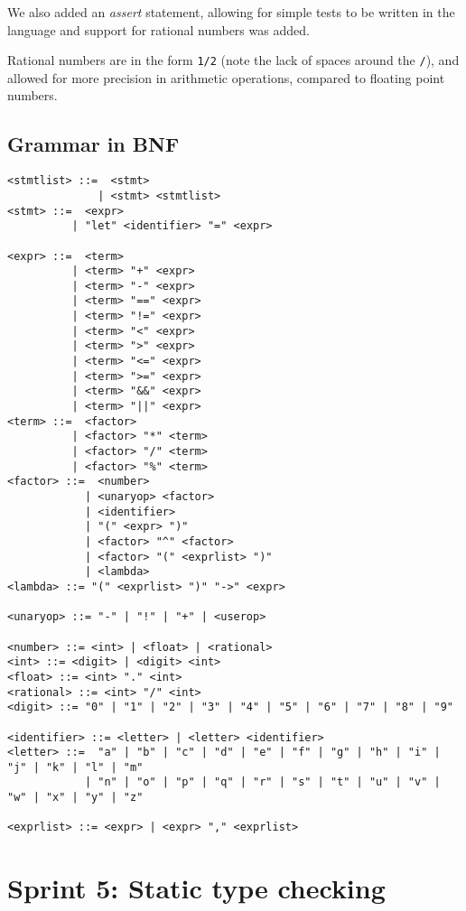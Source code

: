 We also added an \textit{assert} statement, allowing for simple tests to be written in the language and support for 
rational numbers was added.

Rational numbers are in the form \texttt{1/2} (note the lack of spaces around the \texttt{/}), and allowed for more 
precision in arithmetic operations, compared to floating point numbers.

\subsection{Grammar in BNF}\label{subsec:grammar-in-bnf4}

\begin{verbatim}
<stmtlist> ::=  <stmt> 
              | <stmt> <stmtlist>
<stmt> ::=  <expr> 
          | "let" <identifier> "=" <expr>

<expr> ::=  <term> 
          | <term> "+" <expr> 
          | <term> "-" <expr>
          | <term> "==" <expr>
          | <term> "!=" <expr>
          | <term> "<" <expr>
          | <term> ">" <expr>
          | <term> "<=" <expr>
          | <term> ">=" <expr>
          | <term> "&&" <expr>
          | <term> "||" <expr>
<term> ::=  <factor> 
          | <factor> "*" <term> 
          | <factor> "/" <term> 
          | <factor> "%" <term> 
<factor> ::=  <number> 
            | <unaryop> <factor>
            | <identifier> 
            | "(" <expr> ")" 
            | <factor> "^" <factor>
            | <factor> "(" <exprlist> ")"
            | <lambda>
<lambda> ::= "(" <exprlist> ")" "->" <expr>

<unaryop> ::= "-" | "!" | "+" | <userop>
            
<number> ::= <int> | <float> | <rational>
<int> ::= <digit> | <digit> <int>
<float> ::= <int> "." <int>
<rational> ::= <int> "/" <int>
<digit> ::= "0" | "1" | "2" | "3" | "4" | "5" | "6" | "7" | "8" | "9"

<identifier> ::= <letter> | <letter> <identifier>
<letter> ::=  "a" | "b" | "c" | "d" | "e" | "f" | "g" | "h" | "i" | "j" | "k" | "l" | "m" 
            | "n" | "o" | "p" | "q" | "r" | "s" | "t" | "u" | "v" | "w" | "x" | "y" | "z"
            
<exprlist> ::= <expr> | <expr> "," <exprlist>

\end{verbatim}

\section{Sprint 5: Static type checking}\label{sec:static-type-checking}

